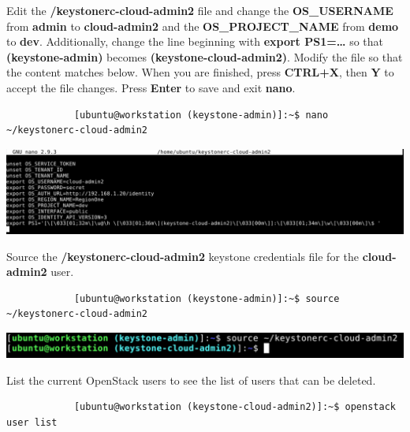 \documentclass[letterpaper, 12pt]{article}
\begin{document}
\begin{enumerate}
    \begin{labstep}
        Edit the \textbf{\texttildemid/keystonerc-cloud-admin2} file and change the \textbf{OS\_USERNAME} from \textbf{admin} to \textbf{cloud-admin2} and the \textbf{OS\_PROJECT\_NAME} from \textbf{demo} to \textbf{dev}.
        Additionally, change the line beginning with \textbf{export PS1=…} so that \textbf{(keystone-admin)} becomes \textbf{(keystone-cloud-admin2)}.
        Modify the file so that the content matches below.
        When you are finished, press \textbf{CTRL+X}, then \textbf{Y} to accept the file changes.
        Press \textbf{Enter} to save and exit \textbf{nano}.
        \begin{lstlisting}
            [ubuntu@workstation (keystone-admin)]:~$ nano ~/keystonerc-cloud-admin2
        \end{lstlisting}

        \begin{center}
            \includegraphics[width=\linewidth]{images/appendix/step5.png}
        \end{center}
    \end{labstep}

    \begin{labstep}
        Source the \textbf{\texttildemid/keystonerc-cloud-admin2} keystone credentials file for the \textbf{cloud-admin2} user.
        \begin{lstlisting}
            [ubuntu@workstation (keystone-admin)]:~$ source ~/keystonerc-cloud-admin2
        \end{lstlisting}

        \begin{center}
            \includegraphics[width=\linewidth]{images/appendix/step6.png}
        \end{center}
    \end{labstep}

    \begin{labstep}
        List the current OpenStack users to see the list of users that can be deleted.
        \begin{lstlisting}
            [ubuntu@workstation (keystone-cloud-admin2)]:~$ openstack user list
        \end{lstlisting}


\end{labstep}
\end{enumerate}
\end{document}
